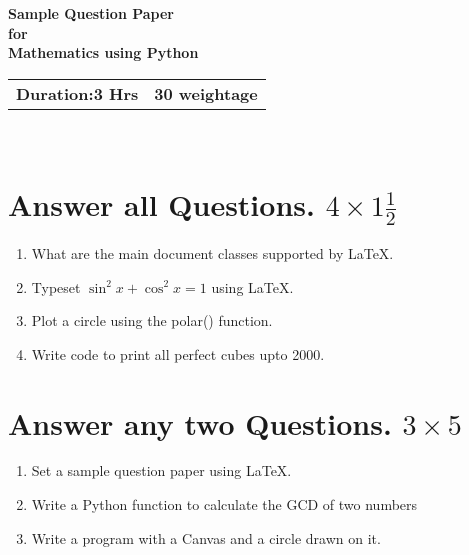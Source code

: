 \documentclass{article}
\date=06
\begin{document}
\begin{center}
\large{\textbf{Sample Question Paper\\for\\Mathematics using Python}}
\end{center}

\begin{tabular}{p{8cm}r}
\textbf{Duration:3 Hrs} & \textbf{30 weightage}
\end{tabular}\\
\section{Answer all Questions. $4\times 1\frac{1}{2}$}
\begin{enumerate}
\item What are the main document classes supported by LaTeX.
\item Typeset $\sin^{2}x+\cos^{2}x=1$ using LaTeX.
\item Plot a circle using the polar() function.
\item Write code to print all perfect cubes upto 2000.
\end{enumerate}
\section{Answer any two Questions. $3\times 5$}
\begin{enumerate}
\item Set a sample question paper using LaTeX.
\item Write a Python function to calculate the GCD of two numbers
\item Write a program with a Canvas and a circle drawn on it.
\end{enumerate}
\begin{center}\end{center}
\end{document}
